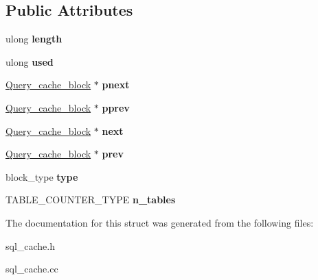 \subsection*{Public Attributes}
\begin{DoxyCompactItemize}
\item 
\mbox{\label{structQuery__cache__block_a19cc10da5a96a0ab5d65aa41e63f149e}} 
ulong {\bfseries length}
\item 
\mbox{\label{structQuery__cache__block_a6c11f07808f2010ad1a3a25e7dacf66a}} 
ulong {\bfseries used}
\item 
\mbox{\label{structQuery__cache__block_ac12adeee8a7e8e1f5db0faaef552b567}} 
\mbox{\hyperlink{structQuery__cache__block}{Query\+\_\+cache\+\_\+block}} $\ast$ {\bfseries pnext}
\item 
\mbox{\label{structQuery__cache__block_ad4c14093cc91df81eb8b24c72235a349}} 
\mbox{\hyperlink{structQuery__cache__block}{Query\+\_\+cache\+\_\+block}} $\ast$ {\bfseries pprev}
\item 
\mbox{\label{structQuery__cache__block_a500d3934506a95803298a0d587932231}} 
\mbox{\hyperlink{structQuery__cache__block}{Query\+\_\+cache\+\_\+block}} $\ast$ {\bfseries next}
\item 
\mbox{\label{structQuery__cache__block_a506d87ec6a6b4229f06e921182a55f91}} 
\mbox{\hyperlink{structQuery__cache__block}{Query\+\_\+cache\+\_\+block}} $\ast$ {\bfseries prev}
\item 
\mbox{\label{structQuery__cache__block_a7e2134fd8e1a1dc90b33643be1d8a840}} 
block\+\_\+type {\bfseries type}
\item 
\mbox{\label{structQuery__cache__block_ae11743fb95799792b2fbe835ccd4e9e5}} 
T\+A\+B\+L\+E\+\_\+\+C\+O\+U\+N\+T\+E\+R\+\_\+\+T\+Y\+PE {\bfseries n\+\_\+tables}
\end{DoxyCompactItemize}


The documentation for this struct was generated from the following files\+:\begin{DoxyCompactItemize}
\item 
sql\+\_\+cache.\+h\item 
sql\+\_\+cache.\+cc\end{DoxyCompactItemize}
